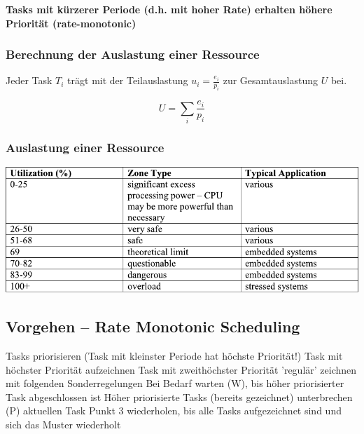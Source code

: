 \vspace{0.1cm}

\textbf{Tasks mit kürzerer Periode (d.h. mit hoher Rate) erhalten höhere Priorität (rate-monotonic)}


\subsubsection{Berechnung der Auslastung einer Ressource}

\begin{minipage}[t]{0.48\columnwidth}
    Jeder Task $T_i$ trägt mit der Teilauslastung $u_i = \frac{e_i}{p_i}$ zur Gesamtauslastung $U$ bei.
\end{minipage}
\hfill
\begin{minipage}[t]{0.48\columnwidth}
    \vspace{-0.2cm}
    $$ U = \sum\limits_{i} \frac{e_i}{p_i} $$
\end{minipage}


\subsubsection{Auslastung einer Ressource}

\includegraphics[width=\columnwidth]{images/tabelle_auslastung_system.pdf}


\subsection{Vorgehen -- Rate Monotonic Scheduling}

\begingroup
\renewcommand{\outlinei}{enumerate}
\renewcommand{\outlineii}{itemize}
\begin{outline}
    \1 Tasks priorisieren (Task mit kleinster Periode hat höchste Priorität!)
    \1 Task mit höchster Priorität aufzeichnen
    \1 Task mit zweithöchster Priorität 'regulär' zeichnen mit folgenden Sonderregelungen
        \2 Bei Bedarf warten (W), bis höher priorisierter Task abgeschlossen ist 
        \2 Höher priorisierte Tasks (bereits gezeichnet) unterbrechen (P) aktuellen Task
    \1 Punkt 3 wiederholen, bis alle Tasks aufgezeichnet sind und sich das Muster wiederholt
\end{outline}
\endgroup


